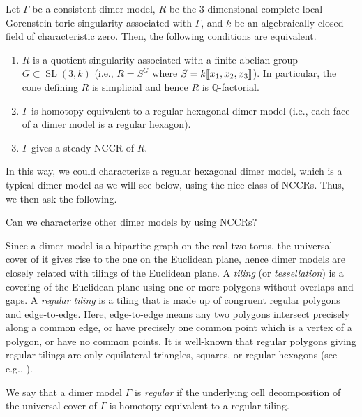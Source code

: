 \documentclass[ALCO,ThmDefs,Unicode]{cedram}
\newcommand{\QQ}{\mathbb{Q}}
\DeclareMathOperator{\SL}{SL}
\newcommand{\llbracket}{\mathopen{[\mkern -2.7mu[}}
\newcommand{\rrbracket}{\mathclose{]\mkern -2.7mu]}}
\begin{document}
\begin{theo}\label{dimer}
Let $\Gamma$ be a consistent dimer model, $R$ be the $3$-dimensional complete local Gorenstein toric singularity associated with $\Gamma$, and $k$ be an algebraically closed field of characteristic zero. Then, the following conditions are equivalent.
\begin{enumerate}%
\item $R$ is a quotient singularity associated with a finite abelian group $G\subset\SL(3, k)$ (i.e., $R=S^G$ where $S=k\llbracket x_1,x_2, x_3\rrbracket $). In particular, the cone defining $R$ is simplicial and hence $R$ is $\QQ$-factorial.
\item $\Gamma$ is homotopy equivalent to a regular hexagonal dimer model $($i.e., each face of a dimer model is a regular hexagon$)$.
\item $\Gamma$ gives a steady NCCR of $R$.
\end{enumerate}
\end{theo}

In this way, we could characterize a regular hexagonal dimer model, which is a typical dimer model as we will see below, using the nice class of NCCRs. Thus, we then ask the following.

\begin{ques}\label{que_dimer}
Can we characterize other dimer models by using NCCRs?
\end{ques}

Since a dimer model is a bipartite graph on the real two-torus, the universal cover of it gives rise to the one on the Euclidean plane, hence dimer models are closely related with tilings of the Euclidean plane. A \emph{tiling} (or \emph{tessellation}) is a covering of the Euclidean plane using one or more polygons without overlaps and gaps. A \emph{regular tiling} is a tiling that is made up of congruent regular polygons and edge-to-edge. Here, edge-to-edge means any two polygons intersect precisely along a common edge, or have precisely one common point which is a vertex of a polygon, or have no common points. It is well-known that regular polygons giving regular tilings are only equilateral triangles, squares, or regular hexagons (see e.g., \cite{GS}).

\begin{defi}
We say that a dimer model $\Gamma$ is \emph{regular} if the underlying cell decomposition of the universal cover of $\Gamma$ is homotopy equivalent to a regular tiling.
\end{defi}
\end{document}
